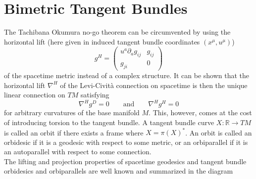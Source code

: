 \documentclass[11pt,a4paper,twoside]{article}
\newcommand{\reals}{\mathbb{R}}
\begin{document}
\section{Bimetric Tangent Bundles}
The Tachibana Okumura no-go theorem can be circumvented by using the
horizontal lift (here given in induced tangent bundle coordinates $(x^\mu,u^\mu)$)
\begin{equation}
  g^H = \left(\begin{array}{cc} u^a \partial_a g_{ij} & g_{ij} \\ g_{ji} & 0 \end{array}\right)
\end{equation}
of the spacetime metric instead of a complex structure. It can be shown \cite{Yano1973} that the horizontal lift
$\nabla^H$ of the
Levi-Civit\`a connection on spacetime is then the unique linear connection
on $TM$ satisfying
\begin{equation}\label{spe2}
  \nabla^H g^D = 0 \qquad \textrm{and} \qquad \nabla^H g^H = 0
\end{equation}
for arbitrary curvatures of the base manifold $M$. This, however,
comes at the cost of introducing torsion to the tangent bundle.
A tangent bundle curve $X: \reals \longrightarrow TM$ is called an
orbit if there exists a frame where $X = \pi(X)^*$. An orbit is called
an orbidesic if it is a geodesic with respect to some metric, or an
orbiparallel if it is an autoparallel with respect to some
connection.\\
The lifting and projection properties of spacetime geodesics and
tangent bundle orbidesics and orbiparallels are well known \cite{Yano1973}
and summarized in the diagram\\[10pt]
\end{document}
